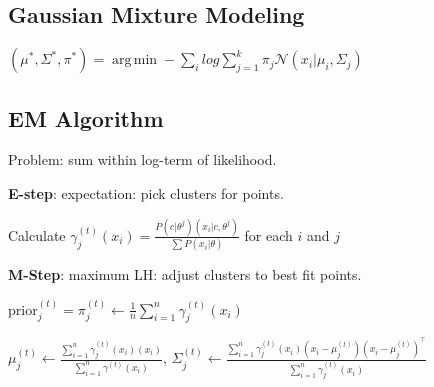 \documentclass[a4paper,10pt,twoside]{extarticle}
\DeclareMathOperator*{\argmin}{arg\,min}
\begin{document}
\begin{landscape}
\begin{multicols*}{3}
\subsection{Gaussian Mixture Modeling}
$
(\mu^*, \Sigma^*, \pi^*) = \argmin -\sum_i log \sum_{j=1}^{k} \pi_j
\mathcal{N}(x_i|\mu_i,\Sigma_j) $

\subsection{EM Algorithm}
Problem: sum within log-term of likelihood.
 
\textbf{E-step}: expectation: pick clusters for points.

Calculate $\gamma_j^{(t)}(x_i) = \frac{P(c|\theta^j) (x_i|c,\theta^j)}{\sum P(x_i|\theta)}$ for each $i$ and $j$

\textbf{M-Step}: maximum LH: adjust clusters to best fit points.



$
\text{prior}_j^{(t)} = \pi^{(t)}_j \leftarrow \frac{1}{n}\sum_{i=1}^n
\gamma_j^{(t)}(x_i) 
$

$
\mu_j^{(t)} \leftarrow \frac{\sum_{i=1}^n \gamma_j^{(t)}(x_i)(x_i)}{\sum_{i=1}^n \gamma^{(t)}(x_i)} 
$,
$
\Sigma^{(t)}_j \leftarrow \frac{\sum_{i=1}^n
\gamma_j^{(t)}(x_i)(x_i-\mu_j^{(t)})(x_i-\mu_j^{(t)})^\top}{\sum_{i=1}^n \gamma_j^{(t)}(x_i)} $

\begin{comment}

\end{comment}
\end{multicols*}
\end{landscape}
\end{document}
